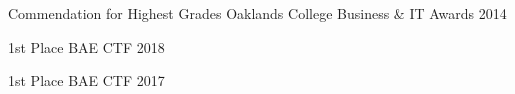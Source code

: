



\begin{cvhonors}

  \cvhonor
    {Commendation for Highest Grades} %
    {Oaklands College Business \& IT Awards} %
    {} %
    {2014} %

\end{cvhonors}




\begin{cvhonors}

  \cvhonor
    {1st Place} %
    {BAE CTF} %
    {} %
    {2018} %

  \cvhonor
    {1st Place} %
    {BAE CTF} %
    {} %
    {2017} %

\end{cvhonors}
